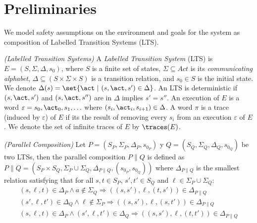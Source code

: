 \section{Preliminaries}

We model safety assumptions on the environment and goals for the system as composition of Labelled Transition Systems (LTS). 


\begin{definition}
\label{def:LTS} \emph{(Labelled Transition Systems)} 
A \emph{Labelled Transition System} (LTS) is $E =  (S, \Sigma, \Delta, s_0)$, where $S$ is a finite set of states, $\Sigma \subseteq Act$ is its {\em communicating alphabet}, $\Delta \subseteq (S \times \Sigma \times S)$ is a transition relation, and $s_0 \in S$ is the initial state.  We denote $\Delta(s)=\set{\act~|~(s,\act,s') \in \Delta}$. 
An LTS is deterministic if $(s,\act,s')$ and $(s,\act,s'')$ are in $\Delta$ implies $s'=s''$.
An execution of $E$ is a word $\varepsilon=s_0, \act_0, s_1, \ldots$ where $(s_i, \act_i, s_{i+1}) \in \Delta$. 
A word $\pi$ is a trace (induced by $\varepsilon$) of $E$ if its the result of removing every $s_i$ from an execution $\varepsilon$ of $E$. 
We denote the set of infinite traces of $E$ by $\traces(E)$. 
\end{definition}



\begin{definition}\label{def:parallelComposition}\emph{(Parallel Composition)}
Let $P=(S_P,\Sigma_P,\Delta_P,s_{0_P})$ y $Q=(S_Q,\Sigma_Q,\Delta_Q,s_{0_Q})$ be two LTSs, then 
the parallel composition $P\|Q$ is defined as $P \| Q = (S_P \times S_Q, \Sigma_P \cup \Sigma_Q, \Delta_{P\|Q}, (s_{0_P}, s_{0_Q}))$
where $\Delta_{P\|Q}$ is the smallest relation satisfying that for all $s, t \in S_P$, $s',t' \in S_Q$ and $\ell \in \Sigma_P \cup \Sigma_Q$:
\small
\begin{gather*}
 (s,\ell,t) \in \Delta_{P} \wedge a \not\in \Sigma_Q \Rightarrow ((s,s'),\ell,(t,s')) \in \Delta_{P\|Q}\\
(s',\ell,t') \in \Delta_{Q} \wedge \ell \not\in \Sigma_P \Rightarrow ((s,s'),\ell,(s,t')) \in \Delta_{P\|Q}\\
(s,\ell,t) \in \Delta_{P} \wedge (s',\ell,t') \in \Delta_{Q} \Rightarrow ((s,s'),\ell,(t,t')) \in \Delta_{P\|Q} 
\end{gather*}
\normalsize
\end{definition}

